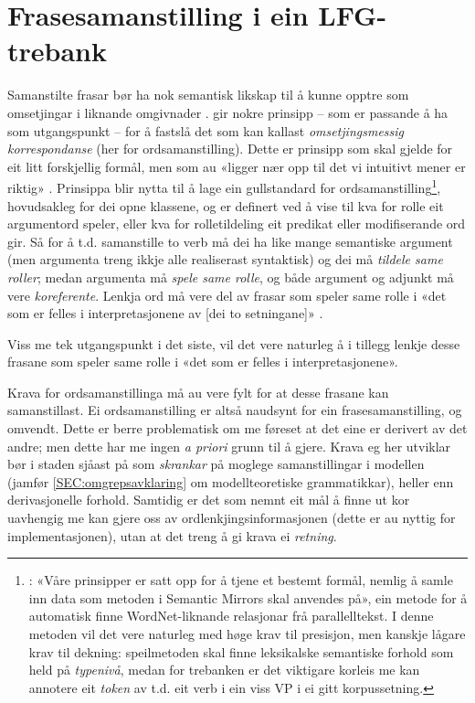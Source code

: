 \documentclass[11pt,a4paper,oneside,draft]{report}
\begin{document}
\section{Frasesamanstilling i ein LFG-trebank}
\label{sec-3.3}


Samanstilte frasar bør ha nok semantisk likskap til å kunne opptre som
omsetjingar i liknande omgivnader
\citep[s.~74]{dyvik2009lmp}. \citet{thunes2003eal} gir nokre prinsipp
-- som er passande å ha som utgangspunkt -- for å fastslå det som kan
kallast \emph{omsetjingsmessig korrespondanse} (her for
ordsamanstilling). Dette er prinsipp som skal gjelde for eit litt
forskjellig formål, men som au «ligger nær opp til det vi intuitivt
mener er riktig» \citep[s.~2]{thunes2003eal}. Prinsippa blir nytta til
å lage ein gullstandard for ordsamanstilling\footnote{\cite[s.~2]{thunes2003eal}: «Våre prinsipper er satt
       opp for å tjene et bestemt formål, nemlig å samle inn data som
       metoden i Semantic Mirrors skal anvendes på», ein metode for å
       automatisk finne WordNet-liknande relasjonar frå
       parallelltekst. I denne metoden vil det vere naturleg med høge
       krav til presisjon, men kanskje lågare krav til dekning:
       speilmetoden skal finne leksikalske semantiske forhold som held
       på \emph{typenivå}, medan for trebanken er det viktigare korleis me
       kan annotere eit \emph{token} av t.d. eit verb i ein viss VP i ei
       gitt korpussetning. },
hovudsakleg for dei opne klassene, og er definert ved å vise til kva
for rolle eit argumentord speler, eller kva for rolletildeling eit
predikat eller modifiserande ord gir. Så for å t.d. samanstille to
verb må dei ha like mange semantiske argument (men argumenta treng
ikkje alle realiserast syntaktisk) og dei må \emph{tildele same roller};
medan argumenta må \emph{spele same rolle}, og både argument og adjunkt må
vere \emph{koreferente}. Lenkja ord må vere del av frasar som speler same
rolle i «det som er felles i interpretasjonene av [dei to setningane]»
\citep[s.~3]{thunes2003eal}.


Viss me tek utgangspunkt i det siste, vil det vere naturleg å i
tillegg lenkje desse frasane som speler same rolle i «det som er
felles i interpretasjonene».

Krava for ordsamanstillinga må au vere fylt for at desse frasane kan
samanstillast. Ei ordsamanstilling er altså naudsynt for ein
frasesamanstilling, og omvendt. Dette er berre problematisk om me
føreset at det eine er derivert av det andre; men dette har me ingen
\emph{a priori} grunn til å gjere. Krava eg her utviklar bør i staden
sjåast på som \emph{skrankar} på moglege samanstillingar i modellen (jamfør
\ref{SEC:omgrepsavklaring} om modellteoretiske grammatikkar), heller
enn derivasjonelle forhold. Samtidig er det som nemnt eit mål å finne
ut kor uavhengig me kan gjere oss av ordlenkjingsinformasjonen (dette
er au nyttig for implementasjonen), utan at det treng å gi krava ei
\emph{retning}.
\end{document}
